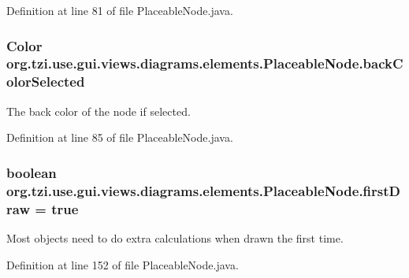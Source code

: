 Definition at line 81 of file Placeable\-Node.\-java.

\hypertarget{classorg_1_1tzi_1_1use_1_1gui_1_1views_1_1diagrams_1_1elements_1_1_placeable_node_adc74a41bc4ce7dd19ad0fb6f1fb0407e}{
\subsubsection[{back\-Color\-Selected}]{\setlength{\rightskip}{0pt plus 5cm}Color org.\-tzi.\-use.\-gui.\-views.\-diagrams.\-elements.\-Placeable\-Node.\-back\-Color\-Selected\hspace{0.3cm}{\ttfamily [protected]}}}\label{classorg_1_1tzi_1_1use_1_1gui_1_1views_1_1diagrams_1_1elements_1_1_placeable_node_adc74a41bc4ce7dd19ad0fb6f1fb0407e}
The back color of the node if selected. 

Definition at line 85 of file Placeable\-Node.\-java.

\hypertarget{classorg_1_1tzi_1_1use_1_1gui_1_1views_1_1diagrams_1_1elements_1_1_placeable_node_a2849ff2aeb615434d82c9112a11c2bac}{
\subsubsection[{first\-Draw}]{\setlength{\rightskip}{0pt plus 5cm}boolean org.\-tzi.\-use.\-gui.\-views.\-diagrams.\-elements.\-Placeable\-Node.\-first\-Draw = true\hspace{0.3cm}{\ttfamily [protected]}}}\label{classorg_1_1tzi_1_1use_1_1gui_1_1views_1_1diagrams_1_1elements_1_1_placeable_node_a2849ff2aeb615434d82c9112a11c2bac}
Most objects need to do extra calculations when drawn the first time. 

Definition at line 152 of file Placeable\-Node.\-java.

